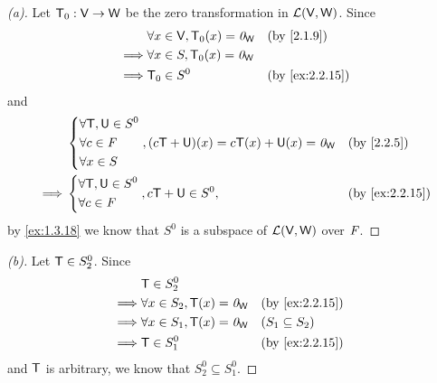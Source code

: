 \begin{proof}[(a)]
  Let \(\mathsf{T}_0 : \mathsf{V} \to \mathsf{W}\) be the zero transformation in \(\mathcal{L}(\mathsf{V}, \mathsf{W})\).
  Since
  \begin{align*}
             & \forall x \in \V, \zT(x) = \zv_{\W} &  & \text{(by \cref{2.1.9})}     \\
    \implies & \forall x \in S, \zT(x) = \zv_{\W}                                    \\
    \implies & \zT \in S^0                         &  & \text{(by \cref{ex:2.2.15})}
  \end{align*}
  and
  \begin{align*}
             & \begin{dcases}
                 \forall \T, \U \in S^0 \\
                 \forall c \in \F       \\
                 \forall x \in S
               \end{dcases}, (c\T + \U)(x) = c \T(x) + \U(x) = \zv_{\W} &  & \text{(by \cref{2.2.5})}     \\
    \implies & \begin{dcases}
                 \forall \T, \U \in S^0 \\
                 \forall c \in \F
               \end{dcases}, c\T + \U \in S^0,                          &  & \text{(by \cref{ex:2.2.15})}
  \end{align*}
  by \cref{ex:1.3.18} we know that \(S^0\) is a subspace of \(\mathcal{L}(\mathsf{V}, \mathsf{W})\) over \(\mathit{F}\).
\end{proof}

\begin{proof}[(b)]
  Let \(\mathsf{T} \in S_2^0\).
  Since
  \begin{align*}
             & \T \in S_2^0                                                          \\
    \implies & \forall x \in S_2, \T(x) = \zv_{\W} &  & \text{(by \cref{ex:2.2.15})} \\
    \implies & \forall x \in S_1, \T(x) = \zv_{\W} &  & (S_1 \subseteq S_2)          \\
    \implies & \T \in S_1^0                        &  & \text{(by \cref{ex:2.2.15})}
  \end{align*}
  and \(\mathsf{T}\) is arbitrary, we know that \(S_2^0 \subseteq S_1^0\).
\end{proof}

